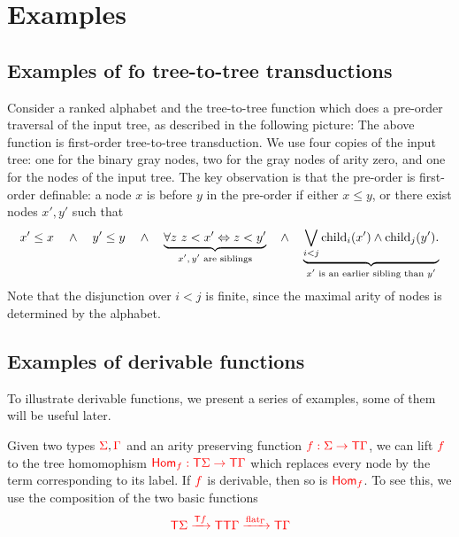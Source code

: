 \section{Examples}

\subsection{Examples of fo tree-to-tree transductions}\label{sec:appendix-example-fo-transductions}
\begin{example}\label{ex:pre-order}
    Consider a ranked alphabet
    and the tree-to-tree function which does a pre-order traversal of the input tree, as described in the following picture:
     The above function is first-order tree-to-tree transduction. We use four copies of the input tree: one for the binary gray nodes, two for the gray nodes of arity zero, and one for the nodes of the input tree. The key observation is that the pre-order  is first-order definable: a node $x$ is before $y$ in the pre-order if either $x \le y$, or there exist nodes $x',y'$ such that 
     \begin{align*}
         x' \le x \quad \land \quad  y' \le y \quad \land \quad \underbrace{\forall z \ z < x' \Leftrightarrow z < y'}_{\text{$x',y'$ are siblings}} \quad \land \quad \underbrace{\bigvee_{i<j}\mathrm{child}_{i} (x') \land \mathrm{child}_{j}(y').}_{\text{$x'$ is an earlier sibling than $y'$}}
     \end{align*}
     Note that the disjunction over  $i<j$ is finite, since the maximal arity of nodes is determined by the alphabet. 
\end{example}

\subsection{Examples of derivable functions}\label{sec:AppendixExamples}
To illustrate derivable functions, we present a series of examples, some of them will be useful later.


\noindent \begin{example}\label{ex:morphism} 
Given two types ${\color{red}{\Sigma}}, {\color{red}{\Gamma}}$ and an arity preserving  function ${\color{red}{f:\Sigma\to{\color{red}{\mathsf T}}\Gamma}}$, we can lift ${\color{red}{f}}$ to the tree homomophism  ${\color{red}{\mathsf{Hom}_f:{\color{red}{\mathsf T}}\Sigma\to {\color{red}{\mathsf T}}\Gamma}}$ which replaces every node by the term corresponding to its label. If ${\color{red}{f}}$ is derivable, then so is  ${\color{red}{\mathsf{Hom}_f}}$. To see this, we use the composition of the two basic functions
\begin{align*}
{\color{red}{{\color{red}{\mathsf T}}\Sigma\xrightarrow{{\color{red}{\mathsf T}}f}{\color{red}{\mathsf T}}{\color{red}{\mathsf T}}\Gamma \xrightarrow{{\color{red}{\mathrm{flat}}}_\Gamma} {\color{red}{\mathsf T}}\Gamma}}
\end{align*}
\end{example}


